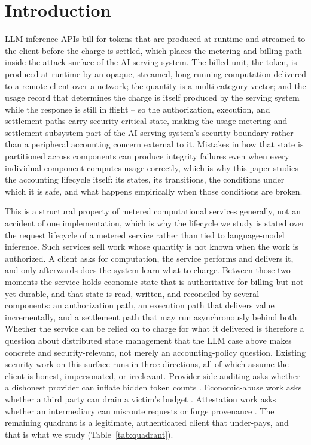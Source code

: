 \documentclass[manuscript,review]{acmart}
\begin{document}
\section{Introduction}
\label{sec:intro}
LLM inference APIs bill for tokens that are produced at runtime and streamed to the
client before the charge is settled, which places the metering and billing path inside
the attack surface of the AI-serving system. The billed unit, the
token, is produced at runtime by an opaque, streamed, long-running computation delivered
to a remote client over a network; the quantity is a multi-category vector; and the
usage record that determines the charge is itself produced by the serving system while
the response is still in flight -- so the authorization, execution, and settlement paths
carry security-critical state, making the usage-metering and settlement
subsystem part of the AI-serving system's security boundary rather than a peripheral
accounting concern external to it. Mistakes in how that state is
partitioned across components can produce integrity failures even when every individual
component computes usage correctly, which is why this paper studies the accounting
lifecycle itself: its states, its transitions, the conditions under which it is safe, and
what happens empirically when those conditions are broken.

This is a structural property of metered computational services generally, not an
accident of one implementation, which is why the lifecycle we study is stated over the
request lifecycle of a metered service rather than tied to language-model inference.
Such services sell work whose quantity is not known when the work is
authorized. A client asks for computation, the service performs and delivers it, and only
afterwards does the system learn what to charge. Between those two moments the service
holds economic state that is authoritative for billing but not yet durable, and that
state is read, written, and reconciled by several components: an authorization path, an
execution path that delivers value incrementally, and a settlement path that may run
asynchronously behind both. Whether the service can be relied on to charge for what it
delivered is therefore a question about distributed state management that the LLM case
above makes concrete and security-relevant, not merely an accounting-policy question.
Existing security
work on this surface runs in three directions, all of which assume the client is honest,
impersonated, or irrelevant. Provider-side auditing asks whether a dishonest provider can
inflate hidden token counts \citep{coin,invisible,tokeninflation}. Economic-abuse work asks
whether a third party can drain a victim's budget \citep{dow,dowreview,owasp,llmjacking}.
Attestation work asks whether an intermediary can misroute requests or forge provenance
\citep{aex,gwprov}. The remaining quadrant is a legitimate, authenticated client that
under-pays, and that is what we study (Table~\ref{tab:quadrant}).
\end{document}

